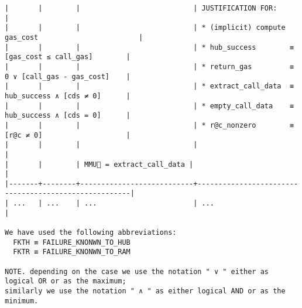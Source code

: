 \documentclass[varwidth=\maxdimen,margin=0.5cm,multi={verbatim}]{standalone}
\begin{document}
\begin{verbatim}
|       |        |                           | JUSTIFICATION FOR:                                   |
|       |        |                           | * (implicit) compute gas_cost                        |
|       |        |                           | * hub_success        ≡  [gas_cost ≤ call_gas]        |
|       |        |                           | * return_gas         ≡  0 ∨ [call_gas - gas_cost]    |
|       |        |                           | * extract_call_data  ≡  hub_success ∧ [cds ≠ 0]      |
|       |        |                           | * empty_call_data    ≡  hub_success ∧ [cds = 0]      |
|       |        |                           | * r@c_nonzero        ≡  [r@c ≠ 0]                    |
|       |        |                           |                                                      |
|       |        | MMU🏴 = extract_call_data |                                                      |
|-------+--------+---------------------------+------------------------------------------------------|
| ...   | ...    | ...                       | ...                                                  |

We have used the following abbreviations:
  FKTH ≡ FAILURE_KNONWN_TO_HUB
  FKTR ≡ FAILURE_KNONWN_TO_RAM

NOTE. depending on the case we use the notation " ∨ " either as logical OR or as the maximum;
similarly we use the notation " ∧ " as either logical AND or as the minimum.
\end{verbatim}
\end{document}
